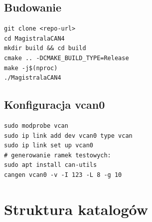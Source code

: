 \documentclass[a4paper,12pt]{article}
\begin{document}
\begin{center}
\end{center}

\subsection{Budowanie}

\begin{lstlisting}[style=bashstyle, caption={Komendy budowania}]
git clone <repo-url>
cd MagistralaCAN4
mkdir build && cd build
cmake .. -DCMAKE_BUILD_TYPE=Release
make -j$(nproc)
./MagistralaCAN4
\end{lstlisting}

\subsection{Konfiguracja vcan0}

\begin{lstlisting}[style=bashstyle, caption={Tworzenie wirtualnego interfejsu CAN}]
sudo modprobe vcan
sudo ip link add dev vcan0 type vcan
sudo ip link set up vcan0
# generowanie ramek testowych:
sudo apt install can-utils
cangen vcan0 -v -I 123 -L 8 -g 10
\end{lstlisting}

\section{Struktura katalogów}
\end{document}
